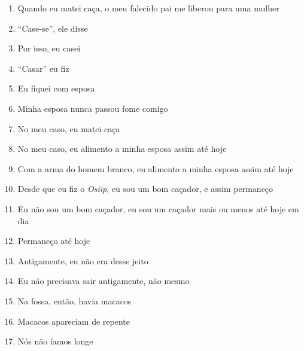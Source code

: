 \begin{enumerate}
 \item Quando eu matei caça, o meu falecido pai me liberou para uma mulher

 \item ``Case-se'', ele disse

 \item Por isso, eu casei

 \item ``Casar'' eu fiz

 \item Eu fiquei com esposa

 \item  Minha esposa nunca passou fome comigo

 \begin{center}\end{center}

 \item No meu caso, eu matei caça

 \item No meu caso, eu alimento a minha esposa assim até hoje

 \item Com a arma do homem branco, eu alimento a minha esposa assim até hoje

 \item Desde que eu fiz o \textit{Osiip}, eu sou um bom caçador, e assim permaneço

 \begin{center}\end{center}

 \item Eu não sou um bom caçador, eu sou um caçador mais ou menos até hoje em dia

 \item Permaneço até hoje

 \item Antigamente, eu não era desse jeito

 \item Eu não precisava sair antigamente, não mesmo

 \begin{center}\end{center}

 \item Na fossa, então, havia macacos

 \item Macacos apareciam de repente

 \item Nós não íamos longe


\end{enumerate}
